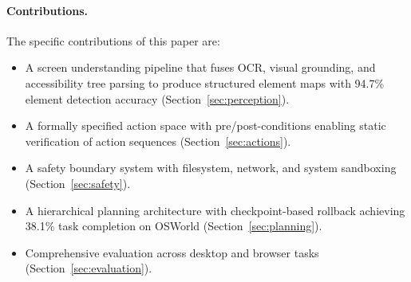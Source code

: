\paragraph{Contributions.} The specific contributions of this paper are:
\begin{itemize}[leftmargin=*]
    \item A screen understanding pipeline that fuses OCR, visual grounding, and accessibility tree parsing to produce structured element maps with 94.7\% element detection accuracy (Section~\ref{sec:perception}).
    \item A formally specified action space with pre/post-conditions enabling static verification of action sequences (Section~\ref{sec:actions}).
    \item A safety boundary system with filesystem, network, and system sandboxing (Section~\ref{sec:safety}).
    \item A hierarchical planning architecture with checkpoint-based rollback achieving 38.1\% task completion on OSWorld (Section~\ref{sec:planning}).
    \item Comprehensive evaluation across desktop and browser tasks (Section~\ref{sec:evaluation}).
\end{itemize}

